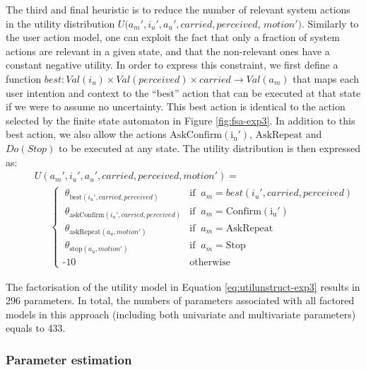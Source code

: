 The third and final heuristic is to reduce the number of relevant system actions in the utility distribution $U(a_m', i_u', a_u', \mathit{carried}, \mathit{perceived}$, $\mathit{motion'})$.  Similarly to the user action model, one can exploit the fact that only a fraction of system actions are relevant in a given state, and that the non-relevant ones have a constant negative utility. In order to express this constraint, we first define a function $best: Val(i_u) \times Val(\mathit{perceived}) \times \mathit{carried} \rightarrow Val(a_m)$ that maps each user intention and context to the ``best'' action that can be executed at that state if we were to assume no uncertainty. This best action is identical to the action selected by the finite state automaton in Figure \ref{fig:fsa-exp3}. In addition to this best action, we also allow the actions $\mathrm{AskConfirm(i_u')}$, $\mathrm{AskRepeat}$ and $Do(Stop)$ to be executed at any state. The utility distribution is then expressed as: 
\begin{align}
&&& U(a_m', i_u', a_u', \mathit{carried}, \mathit{perceived}, \mathit{motion'}) = \nonumber \\
&&& \ \ \ \ \ \ \  \begin{cases} \ \theta_{\text{best}(i_u', \mathit{carried}, \mathit{perceived})} & \text{if } \ a_m = best(i_u', \mathit{carried}, \mathit{perceived}) \\ 
\ \theta_{\text{askConfirm}(i_u', \mathit{carried}, \mathit{perceived})} & \text{if } \ a_m = \mathrm{Confirm(i_u')} \\
\ \theta_{\text{askRepeat}(a_u, \mathit{motion'})} & \text{if } \ a_m = \mathrm{AskRepeat} \\
\ \theta_{\text{stop}(a_u,\mathit{motion'})} & \text{if } \ a_m = \mathrm{Stop} \\ 
\mbox{-}10 & \text{otherwise}
\end{cases} \label{eq:utilunstruct-exp3}
\end{align}

The factorisation of the utility model in Equation \eqref{eq:utilunstruct-exp3} results in 296 parameters. In total, the numbers of parameters associated with all factored models in this approach (including both univariate and multivariate parameters) equals to 433.

\subsubsection*{Parameter estimation}

